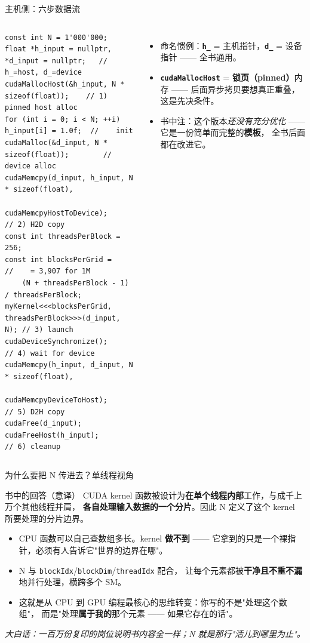 \documentclass[aspectratio=169]{beamer}
\newcommand{\kw}[1]{\textbf{\textcolor{kwblue}{#1}}}
\newcommand{\pe}[1]{{\footnotesize\itshape 大白话：#1}}
\begin{document}
\begin{frame}[fragile]{主机侧：六步数据流}
  \begin{columns}[t]
\begin{lstlisting}
const int N = 1'000'000;
float *h_input = nullptr, *d_input = nullptr;   // h_=host, d_=device
cudaMallocHost(&h_input, N * sizeof(float));    // 1) pinned host alloc
for (int i = 0; i < N; ++i) h_input[i] = 1.0f;  //    init
cudaMalloc(&d_input, N * sizeof(float));        //    device alloc
cudaMemcpy(d_input, h_input, N * sizeof(float),
           cudaMemcpyHostToDevice);             // 2) H2D copy
const int threadsPerBlock = 256;
const int blocksPerGrid =                       //    = 3,907 for 1M
    (N + threadsPerBlock - 1) / threadsPerBlock;
myKernel<<<blocksPerGrid, threadsPerBlock>>>(d_input, N); // 3) launch
cudaDeviceSynchronize();                        // 4) wait for device
cudaMemcpy(h_input, d_input, N * sizeof(float),
           cudaMemcpyDeviceToHost);             // 5) D2H copy
cudaFree(d_input); cudaFreeHost(h_input);       // 6) cleanup
\end{lstlisting}
    \begin{itemize}
      \item 命名惯例：\kw{\texttt{h\_}} = 主机指针，\kw{\texttt{d\_}} = 设备指针
            —— 全书通用。
      \item \kw{\texttt{cudaMallocHost}} = \kw{锁页（pinned）}内存 ——
            后面异步拷贝要想真正重叠，这是先决条件。
      \item 书中注：这个版本\emph{还没有充分优化} —— 它是一份简单而完整的\kw{模板}，
            全书后面都在改进它。
    \end{itemize}
  \end{columns}
\end{frame}

\begin{frame}{为什么要把 N 传进去？单线程视角}
  \begin{block}{书中的回答（意译）}
    CUDA kernel 函数被设计为\kw{在单个线程内部}工作，与成千上万个其他线程并肩，
    \kw{各自处理输入数据的一个分片}。因此 N 定义了这个 kernel 所要处理的分片边界。
  \end{block}
  \begin{itemize}
    \item CPU 函数可以自己查数组多长。kernel \kw{做不到} ——
          它拿到的只是一个裸指针，必须有人告诉它"世界的边界在哪"。
    \item N 与 \texttt{blockIdx}/\texttt{blockDim}/\texttt{threadIdx} 配合，
          让每个元素都被\kw{干净且不重不漏}地并行处理，横跨多个 SM。
    \item 这就是从 CPU 到 GPU 编程最核心的思维转变：你写的不是"处理这个数组"，
          而是"处理\kw{属于我的}那个元素 —— 如果它存在的话"。
  \end{itemize}
  \medskip
  \pe{一百万份复印的岗位说明书内容全一样；N 就是那行"活儿到哪里为止"。}
\end{frame}
\end{document}
